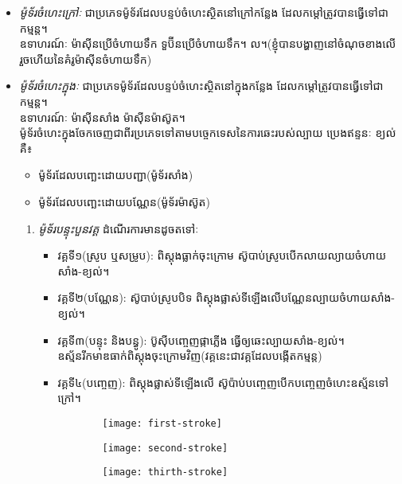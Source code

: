 \begin{itemize}
	\item \emph{\kml ម៉ូទ័រចំហេះក្រៅៈ} ជាប្រភេទម៉ូទ័រដែលបន្ទប់ចំហេះស្ថិតនៅក្រៅកន្លែង ដែលកម្តៅត្រូវបានធ្វើទៅជា កម្មន្ត។\\
	ឧទាហរណ៍ៈ ម៉ាសុីនប្រើចំហាយទឹក ទួប៊ីនប្រើចំហាយទឹក។ ល។(ខ្ញុំបានបង្ហាញនៅចំណុចខាងលើរួចហើយនៃគំរូម៉ាសុីនចំហាយទឹក)
	\item \emph{\kml ម៉ូទ័រចំហេះក្នុងៈ} ជាប្រភេទម៉ូទ័រដែលបន្ទប់ចំហេះស្ថិតនៅក្នុងកន្លែង ដែលកម្តៅត្រូវបានធ្វើទៅជា កម្មន្ត។\\
	ឧទាហរណ៍ៈ ម៉ាសុីនសាំង ម៉ាសុីនម៉ាស៊ូត។\\
	ម៉ូទ័រចំហេះក្នុងចែកចេញជាពីរប្រភេទទៅតាមបច្ចេកទេសនៃការឆេះរបស់ល្បាយ ប្រេងឥន្ទនៈ ខ្យល់ គឺ៖
	\begin{itemize}
		\item ម៉ូទ័រដែលបញ្ឆេះដោយបញ្ជា(ម៉ូទ័រសាំង)
		\item ម៉ូទ័រដែលបញ្ឆេះដោយបណ្ណែន(ម៉ូទ័រម៉ាស៊ូត)
	\end{itemize}
	\begin{enumerate}
		\item \emph{\kml ម៉ូទ័របន្ទុះបួនវគ្គ} ដំណើរការមានដូចតទៅៈ
		\begin{itemize}
			\item វគ្គទី១(ស្រូប ឬសម្រូប): ពិស្តុងធ្លាក់ចុះក្រោម ស៊ូបាប់ស្រូបបើកលាយល្យាយចំហាយសាំង-ខ្យល់។
			\item វគ្គទី២(បណ្ណែន): ស៊ូបាប់ស្រូបបិទ ពិស្តុងផ្លាស់ទីឡើងលើបណ្ណែនល្បាយចំហាយសាំង-ខ្យល់។
			\item វគ្គទី៣(បន្ទុះ និងបន្ធូ): ប៊ូសុីបញ្ចេញផ្កាភ្លើង ធ្វើឲ្យឆេះល្បាយសាំង-ខ្យល់។\\ ឧស្ម័នរីកមាឌធាក់ពិស្តុងចុះក្រោមវិញ(វគ្គនេះជាវគ្គដែលបង្កើតកម្មន្ត)
			\item វគ្គទី៤(បញ្ចេញ): ពិស្តុងផ្លាស់ទីឡើងលើ ស៊ូប៉ាប់បញ្ចេញបើកបញ្ចេញចំហេះឧស្ម័នទៅក្រៅ។
		\end{itemize}
		\begin{figure}[H]
			\centering
			\begin{subfigure}{.2\textwidth}
				\texttt{[image: first-stroke]}
			\end{subfigure}
			\begin{subfigure}{.2\textwidth}
				\texttt{[image: second-stroke]}
			\end{subfigure}
			\begin{subfigure}{.2\textwidth}
				\texttt{[image: thirth-stroke]}
			\end{subfigure}

\end{figure}
\end{enumerate}
\end{itemize}
